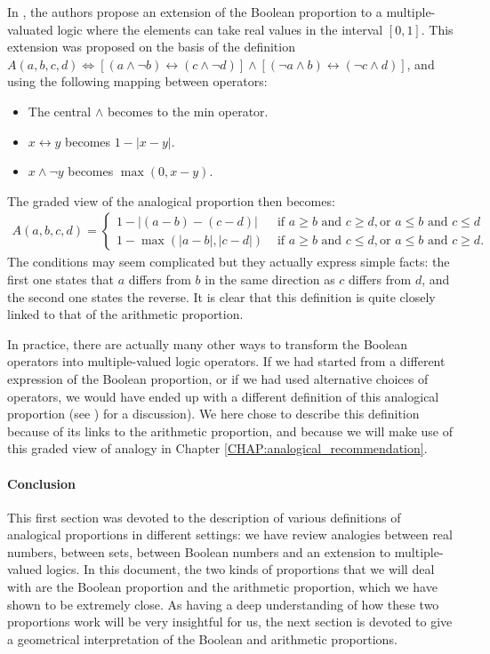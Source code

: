In \cite{PraRic13}, the authors propose an extension of the Boolean proportion
to a multiple-valuated logic where the elements can take real values in the
interval $[0, 1]$.  This extension was proposed on the basis of the definition
$A(a, b, c, d) \iff \left[(a \wedge \neg b) \leftrightarrow (c \wedge \neg
d)\right]  \wedge \left[(\neg a \wedge b)\leftrightarrow (\neg c \wedge
d)\right]$, and using the following mapping between operators:
\begin{itemize}
  \item The central $\wedge$ becomes to the min operator.
  \item $x \leftrightarrow y$ becomes $1 - |x - y|$.
  \item $x \wedge \neg y$ becomes $\max(0, x-y)$.
\end{itemize}
The graded view of the analogical proportion then becomes:
\begin{align*}
A(a, b, c, d) =
\begin{cases}
  1 - |(a - b) - (c - d)| &\text{ if } a \geq b \text { and } c \geq d, \text{
    or } a \leq b \text{ and } c \leq d\\
  1 - \max(|a - b|, |c - d|) &\text{ if } a \geq b \text { and } c \leq d, \text{
    or } a \leq b \text{ and } c \geq d.
\end{cases}
\end{align*}
The conditions may seem complicated but they actually express simple facts: the
first one states that $a$ differs from $b$ in the same direction as $c$ differs
from $d$, and the second one states the reverse. It is clear that this
definition is quite closely linked to that of the arithmetic proportion.

In practice, there are actually many other ways to transform the Boolean
operators into multiple-valued logic operators. If we had started from a
different expression of the Boolean proportion, or if we had used alternative
choices of operators, we would have ended up with a different definition of
this analogical proportion (see \cite{PraRic13}) for a discussion).  We here
chose to describe this definition because of its links to the arithmetic
proportion, and because  we will make use of this graded view of analogy in
Chapter \ref{CHAP:analogical_recommendation}.

\paragraph{Conclusion\\}
This first section was devoted to the description of various definitions of
analogical proportions in different settings: we have review analogies between
real numbers, between sets, between Boolean numbers and an extension to
multiple-valued logics. In this document, the two kinds of proportions that we
will deal with are the Boolean proportion and the arithmetic proportion, which
we have shown to be extremely close. As having a deep understanding of how
these two proportions work will be very insightful for us, the next section is
devoted to give a geometrical interpretation of the Boolean and arithmetic
proportions.

